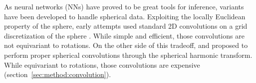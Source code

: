 \documentclass{article} %
\newcommand{\secref}[1]{section~\ref{sec:#1}}
\begin{document}


As neural networks (NNs) have proved to be great tools for inference, variants have been developed to handle spherical data.
Exploiting the locally Euclidean property of the sphere, early attempts used standard 2D convolutions on a grid discretization of the sphere \citep{boomsma2017sphericalcnn, su2017sphericalcnn, coors2018sphericalcnn}.
While simple and efficient, those convolutions are not equivariant to rotations.
On the other side of this tradeoff, \citet{cohen2018sphericalcnn} and \citet{esteves2018sphericalcnn} proposed to perform proper spherical convolutions through the spherical harmonic transform.
While equivariant to rotations, those convolutions are expensive (\secref{method:convolution}).

\end{document}
